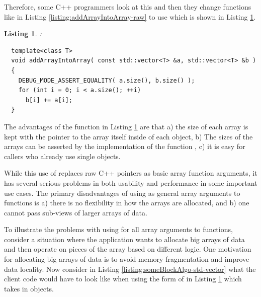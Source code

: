 \documentclass[pdf,ps2pdf,11pt]{SANDreport}
\newtheorem{listing}{Listing}
\begin{document}
Therefore, some C++ programmers look at this and then they change
functions like {} in Listing
{}\ref{listing:addArrayIntoArray-raw} to use {}
which is shown in Listing
{}\ref{listing:addArrayIntoArray-std-vector}.

\begin{listing}:\\
\label{listing:addArrayIntoArray-std-vector}
{\small\begin{verbatim}
  template<class T>
  void addArrayIntoArray( const std::vector<T> &a, std::vector<T> &b )
  {
    DEBUG_MODE_ASSERT_EQUALITY( a.size(), b.size() );
    for (int i = 0; i < a.size(); ++i)
      b[i] += a[i];
  }
\end{verbatim}}
\end{listing}

The advantages of the function in Listing
{}\ref{listing:addArrayIntoArray-std-vector} are that a) the size of
each array is kept with the pointer to the array itself inside of each
{} object, b) The sizes of the arrays can be
asserted by the implementation of the function
{}, c) it is easy for callers who
already use single {} objects.

While this use of {} replaces raw C++ pointers as
basic array function arguments, it has several serious problems in
both usability and performance in some important use cases.  The
primary disadvantages of using {} as general array
arguments to functions is a) there is no flexibility in how the arrays
are allocated, and b) one cannot pass sub-views of larger arrays of
data.

To illustrate the problems with using {} for all
array arguments to functions, consider a situation where the
application wants to allocate big arrays of data and then operate on
pieces of the array based on different logic.  One motivation for
allocating big arrays of data is to avoid memory fragmentation and
improve data locality.  Now consider in Listing
{}\ref{listing:someBlockAlgo-std-vector} what the client code would
have to look like when using the form of
{} in Listing
{}\ref{listing:addArrayIntoArray-std-vector} which takes in
{} objects.
\end{document}
